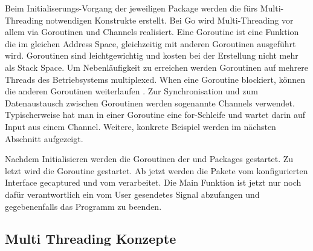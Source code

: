 Beim Initialiserungs-Vorgang der jeweiligen Package werden die fürs Multi-Threading notwendigen Konstrukte erstellt. Bei Go wird Multi-Threading vor allem via Goroutinen und Channels realisiert. Eine Goroutine ist eine Funktion die im gleichen Address Space, gleichzeitig mit anderen Goroutinen ausgeführt wird. Goroutinen sind leichtgewichtig und kosten bei der Erstellung nicht mehr als Stack Space. Um Nebenläufigkeit zu erreichen werden Goroutinen auf mehrere Threads des Betriebsystems multiplexed. When eine Goroutine blockiert, können die anderen Goroutinen weiterlaufen \cite[:1391]{effective_go}.
Zur Synchronisation und zum Datenaustausch zwischen Goroutinen werden sogenannte Channels verwendet. Typischerweise hat man in einer Goroutine eine for-Schleife und wartet darin auf Input aus einem Channel. Weitere, konkrete Beispiel werden im nächsten Abschnitt aufgezeigt.

Nachdem Initialisieren werden die Goroutinen der  und  Packages gestartet. Zu letzt wird die  Goroutine gestartet. Ab jetzt werden die Pakete vom konfigurierten Interface gecaptured und vom \tool{} verarbeitet. Die Main Funktion ist jetzt nur noch dafür verantwortlich ein vom User gesendetes  Signal abzufangen und gegebenenfalls das Programm zu beenden.

\subsection{Multi Threading Konzepte}


